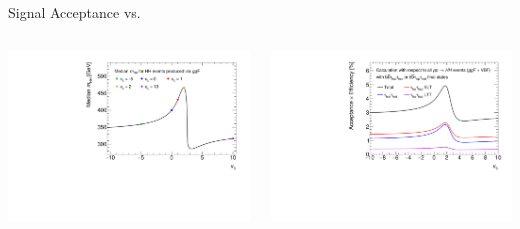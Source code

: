 \documentclass[11pt, xcolor={dvipsnames}, aspectratio=169, notes]{beamer}
\begin{document}

\begin{frame}{Signal Acceptance vs.\ \allbold{\klambda}}
  \begin{columns}
    \includegraphics[width=\textwidth]{self_coupling/hh_median_mhh_vs_klam}\hfill%

    \includegraphics[width=\textwidth]{self_coupling/acc_vs_klam}
  \end{columns}
\end{frame}

\end{document}
